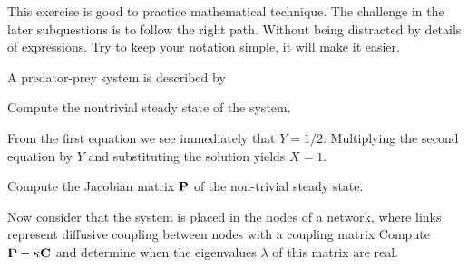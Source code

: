 This exercise is good to practice mathematical technique. The challenge in the later subquestions is to follow the right path. Without being distracted by details of expressions. Try to keep your notation simple, it will make it easier. 

A predator-prey system is described by

\subquestion Compute the nontrivial steady state of the system.

\solution
From the first equation we see immediately that $Y=1/2$. Multiplying the second equation by $Y$ and substituting the solution yields $X=1$.

\subquestion  Compute the Jacobian matrix $\bf P$ of the non-trivial steady state.

\solution
{}

\subquestion  Now consider that the system is placed in the nodes of a network, where links represent diffusive coupling between nodes with a coupling matrix 
Compute ${\bf P}-\kappa {\bf C}$ and determine when the eigenvalues $\lambda$ of this matrix are real.

